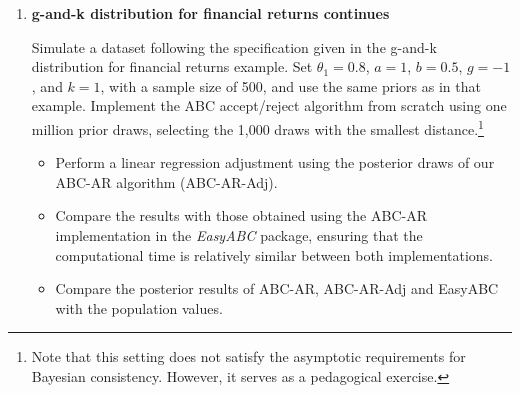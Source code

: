 \begin{enumerate}
	\item \textbf{g-and-k distribution for financial returns continues}
	
	Simulate a dataset following the specification given in the g-and-k distribution for financial returns example. Set $\theta_1 = 0.8$, $a = 1$, $b = 0.5$, $g = -1$, and $k = 1$, with a sample size of 500, and use the same priors as in that example. Implement the ABC accept/reject algorithm from scratch using one million prior draws, selecting the 1,000 draws with the smallest distance.\footnote{Note that this setting does not satisfy the asymptotic requirements for Bayesian consistency. However, it serves as a pedagogical exercise.}
	
	\begin{itemize}
		\item Perform a linear regression adjustment using the posterior draws of our ABC-AR algorithm (ABC-AR-Adj).
		\item Compare the results with those obtained using the ABC-AR implementation in the \textit{EasyABC} package, ensuring that the computational time is relatively similar between both implementations.
		\item Compare the posterior results of ABC-AR, ABC-AR-Adj and EasyABC with the population values.
	\end{itemize}
	

\end{enumerate}
